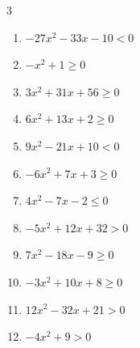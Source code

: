 \begin{multicols}{3}
\begin{enumerate}

  \item $-27x^{2}-33x-10<0$


  \item $-x^{2}+1\geq 0$

        \phantom{$\displaystyle -1 \leqq x \leqq 1$}

  \item $3x^{2}+31x+56\geq 0$


\columnbreak %

  \item $6x^{2}+13x+2\geq 0$


  \item $9x^{2}-21x+10<0$


  \item $-6x^{2}+7x+3\geq 0$


  \item $4x^{2}-7x-2\leq 0$


  \item $-5x^{2}+12x+32>0$


  \item $7x^{2}-18x-9\geq 0$


  \item $-3x^{2}+10x+8\geq 0$


  \item $12x^{2}-32x+21>0$


  \item $-4x^{2}+9>0$


\end{enumerate}
\end{multicols}
